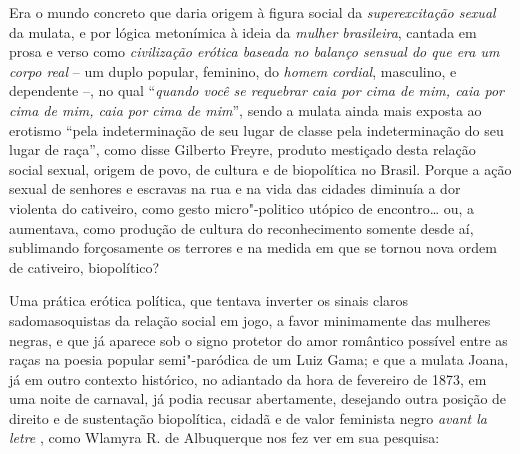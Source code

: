 Era o mundo concreto que daria origem à figura social da
\emph{superexcitação sexual} da mulata, e por lógica metonímica à ideia
da \emph{mulher brasileira}, cantada em prosa e verso como
\emph{civilização erótica baseada no balanço sensual do que era um corpo
real} -- um duplo popular, feminino, do \emph{homem} \emph{cordial},
masculino, e dependente --, no qual ``\emph{quando você se requebrar
caia por cima de mim, caia por cima de mim, caia por cima de mim}'',
sendo a mulata ainda mais exposta ao erotismo ``pela indeterminação de
seu lugar de classe pela indeterminação do seu lugar de raça'', como
disse Gilberto Freyre, produto mestiçado desta relação social sexual,
origem de povo, de cultura e de biopolítica no Brasil. Porque a ação
sexual de senhores e escravas na rua e na vida das cidades diminuía a
dor violenta do cativeiro, como gesto micro"-politico utópico de
encontro\ldots{} ou, a aumentava, como produção de cultura do reconhecimento
somente desde aí, sublimando forçosamente os terrores e na medida em que
se tornou nova ordem de cativeiro, biopolítico?

Uma prática erótica política, que tentava inverter os sinais claros
sadomasoquistas da relação social em jogo, a favor minimamente das
mulheres negras, e que já aparece sob o signo protetor do amor romântico
possível entre as raças na poesia popular semi"-paródica de um Luiz Gama;
e que a mulata Joana, já em outro contexto histórico, no adiantado da
hora de fevereiro de 1873, em uma noite de carnaval, já podia recusar
abertamente, desejando outra posição de direito e de sustentação
biopolítica, cidadã e de valor feminista negro \emph{avant la letre} ,
como Wlamyra R. de Albuquerque nos fez ver em sua pesquisa:

